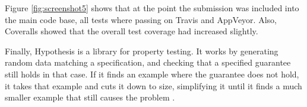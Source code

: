 Figure \ref{fig:screenshot5} shows that at the point the submission was included into the main code base, all tests where passing on Travis and AppVeyor.
Also, Coveralls showed that the overall test coverage had increased slightly.

Finally, Hypothesis \cite{Hypothesis3.6.1} is a library for property testing.
It works by generating random data matching a specification, and checking that a specified guarantee still holds in that case.
If it finds an example where the guarantee does not hold, it takes that example and cuts it down to size, simplifying it until it finds a much smaller example that still causes the problem \cite{HypothesisDocs}.
